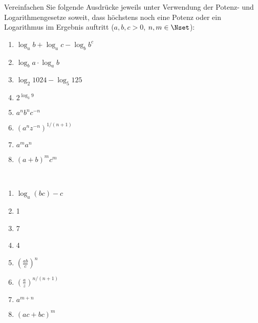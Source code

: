 \documentclass[12pt]{exam}
\begin{document}
\begin{questions}
Vereinfachen Sie folgende Ausdrücke jeweils unter Verwendung der Potenz- und Logarithmengesetze soweit, dass höchstens noch eine Potenz oder ein Logarithmus im Ergebnis auftritt ($a,b,c>0$, $n,m\in\Nset$):\\
\parbox{0.5\textwidth}{\begin{enumerate}
		\item $\log_a b + \log_a c -\log_b b^c$
		\item $\log_b a \cdot \log_a b$
		\item $\log_2 1024 - \log_5 125$
		\item $2^{\log_3 9}$
\end{enumerate}}\parbox{0.5\textwidth}{\begin{enumerate}\setcounter{enumi}{4}
		\item $a^n b^n c^{-n}$
		\item $(a^n z^{-n})^{1/(n+1)}$
		\item $a^m a^n$
		\item $(a+b)^m c^m$
\end{enumerate}}
\begin{solution}\\
	\parbox{0.5\textwidth}{\begin{enumerate}
			\item $\log_a (bc) - c$
			\item 1
			\item 7
			\item 4
	\end{enumerate}}\parbox{0.5\textwidth}{\begin{enumerate}\setcounter{enumi}{4}
			\item $\left(\tfrac{ab}{c}\right)^n$
			\item $\left(\tfrac{a}{z}\right)^{n/(n+1)}$
			\item $a^{m+n}$
			\item $(ac+bc)^m$
	\end{enumerate}}
\end{solution}





\end{questions}
\end{document}
